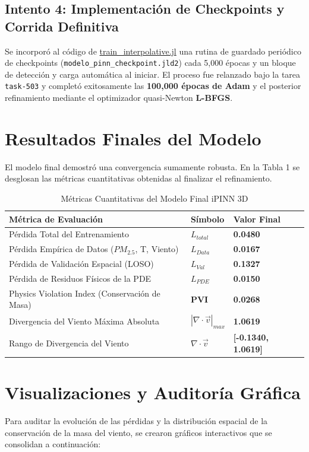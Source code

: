\documentclass[11pt,letterpaper]{article}
\begin{document}
\subsection{Intento 4: Implementación de Checkpoints y Corrida Definitiva}
Se incorporó al código de \href{file:///d:/Usuarios/Cristian/Desktop/proyecto%20ahora%20si/src/pinn/train_interpolative.jl}{train\_interpolative.jl} una rutina de guardado periódico de checkpoints (\texttt{modelo\_pinn\_checkpoint.jld2}) cada 5,000 épocas y un bloque de detección y carga automática al iniciar. El proceso fue relanzado bajo la tarea \texttt{task-503} y completó exitosamente las \textbf{100,000 épocas de Adam} y el posterior refinamiento mediante el optimizador quasi-Newton \textbf{L-BFGS}.

\section{Resultados Finales del Modelo}
El modelo final demostró una convergencia sumamente robusta. En la Tabla 1 se desglosan las métricas cuantitativas obtenidas al finalizar el refinamiento.

\begin{table}[htbp]
\centering
\caption{Métricas Cuantitativas del Modelo Final iPINN 3D}
\label{tab:final_metrics}
\vspace{0.2cm}
\begin{tabular}{lll}
\toprule
\textbf{Métrica de Evaluación} & \textbf{Símbolo} & \textbf{Valor Final} \\
\midrule
Pérdida Total del Entrenamiento & $L_{total}$ & \textbf{0.0480} \\
Pérdida Empírica de Datos ($PM_{2.5}$, T, Viento) & $L_{Data}$ & \textbf{0.0167} \\
Pérdida de Validación Espacial (LOSO) & $L_{Val}$ & \textbf{0.1327} \\
Pérdida de Residuos Físicos de la PDE & $L_{PDE}$ & \textbf{0.0150} \\
Physics Violation Index (Conservación de Masa) & \textbf{PVI} & \textbf{0.0268} \\
Divergencia del Viento Máxima Absoluta & $|\nabla \cdot \vec{v}|_{max}$ & \textbf{1.0619} \\
Rango de Divergencia del Viento & $\nabla \cdot \vec{v}$ & \textbf{[-0.1340, 1.0619]} \\
\bottomrule
\end{tabular}
\end{table}

\section{Visualizaciones y Auditoría Gráfica}
Para auditar la evolución de las pérdidas y la distribución espacial de la conservación de la masa del viento, se crearon gráficos interactivos que se consolidan a continuación:
\end{document}
